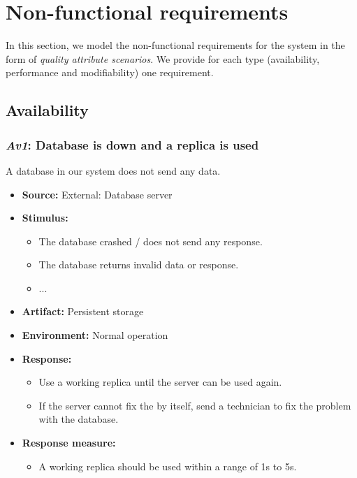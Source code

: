 \documentclass[english]{sareport}
\begin{document}
\chapter{Non-functional requirements}\label{sec:non-functional}
In this section, we model the non-functional requirements for the system in the
form of \emph{quality attribute scenarios}. We provide for each type
(availability, performance and modifiability) one requirement.

\section{Availability}
\subsection{\emph{Av1}: Database is down and a replica is used} %
A database in our system does not send any data.

\begin{itemize}
    \item \textbf{Source:} External: Database server
    \item \textbf{Stimulus:}
        \begin{itemize}
            \item The database crashed / does not send any response.
            \item The database returns invalid data or response.
            \item ... %
        \end{itemize}

    \item \textbf{Artifact:} Persistent storage
    \item \textbf{Environment:} Normal operation
    \item \textbf{Response:}
        \begin{itemize}
            \item Use a working replica until the server can be used again.
            \item If the server cannot fix the by itself, send a technician to fix the problem with the database.
        \end{itemize}

    \item \textbf{Response measure:}
        \begin{itemize}
            \item A working replica should be used within a range of 1s to 5s.
        \end{itemize}
\end{itemize}
\end{document}
